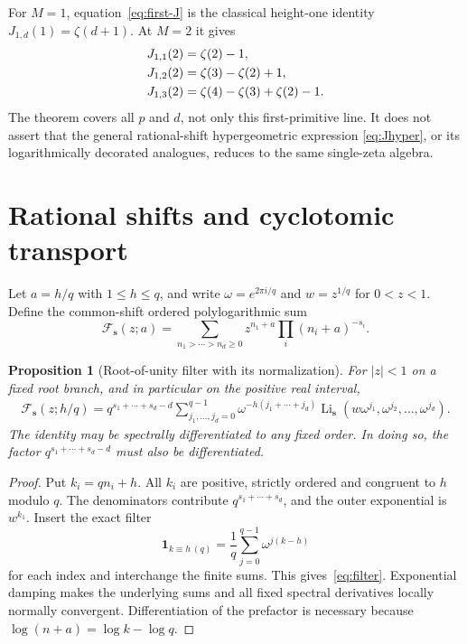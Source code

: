 \documentclass[11pt,oneside]{article}
\numberwithin{equation}{section}
\newtheorem{proposition}[theorem]{Proposition}
\theoremstyle{definition}
\theoremstyle{remark}
\DeclareMathOperator{\Li}{Li}
\begin{document}
For $M=1$, equation~\eqref{eq:first-J} is the classical height-one identity
$J_{1,d}(1)=\zeta(d+1)$. At $M=2$ it gives
\begin{align}
J_{1,1}(2)&=\zeta(2)-1,\notag\\
J_{1,2}(2)&=\zeta(3)-\zeta(2)+1,\notag\\
J_{1,3}(2)&=\zeta(4)-\zeta(3)+\zeta(2)-1.
\label{eq:Jexamples}
\end{align}
The theorem covers all $p$ and $d$, not only this first-primitive line.
It does not assert that the general rational-shift hypergeometric expression
\eqref{eq:Jhyper}, or its logarithmically decorated analogues, reduces to the
same single-zeta algebra.

\section{Rational shifts and cyclotomic transport}
\label{sec:cyclotomic}

Let $a=h/q$ with $1\le h\le q$, and write $\omega=e^{2\pi i/q}$ and
$w=z^{1/q}$ for $0<z<1$. Define the common-shift ordered polylogarithmic sum
\[
\mathcal F_{\mathbf s}(z;a)
=\sum_{n_1>\cdots>n_d\ge0}z^{n_1+a}
                       \prod_i(n_i+a)^{-s_i}.
\]

\begin{proposition}[Root-of-unity filter with its normalization]
\label{prop:filter}
For $|z|<1$ on a fixed root branch, and in particular on the positive real
interval,
\begin{equation}\label{eq:filter}
\begin{split}
\mathcal F_{\mathbf s}(z;h/q)
=q^{s_1+\cdots+s_d-d}
 \sum_{j_1,\ldots,j_d=0}^{q-1}\omega^{-h(j_1+\cdots+j_d)}
 \Li_{\mathbf s}(w\omega^{j_1},\omega^{j_2},\ldots,\omega^{j_d}).
\end{split}
\end{equation}
The identity may be spectrally differentiated to any fixed order. In doing
so, the factor $q^{s_1+\cdots+s_d-d}$ must also be differentiated.
\end{proposition}

\begin{proof}
Put $k_i=qn_i+h$. All $k_i$ are positive, strictly ordered and congruent to
$h$ modulo $q$. The denominators contribute $q^{s_1+\cdots+s_d}$, and the
outer exponential is $w^{k_1}$. Insert the exact filter
\[
\mathbf1_{k\equiv h\ (q)}=\frac1q\sum_{j=0}^{q-1}\omega^{j(k-h)}
\]
for each index and interchange the finite sums. This gives~\eqref{eq:filter}.
Exponential damping makes the underlying sums and all fixed spectral
derivatives locally normally convergent. Differentiation of the prefactor
is necessary because $\log(n+a)=\log k-\log q$.
\end{proof}
\end{document}
